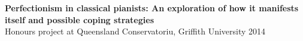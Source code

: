 \documentclass[a4paper,10pt]{article}
\begin{document}
\noindent\textbf{Perfectionism in classical pianists: An exploration of how it manifests itself and possible coping strategies} \\
Honours project at Queensland Conservatoriu, Griffith University 2014



\end{document}

